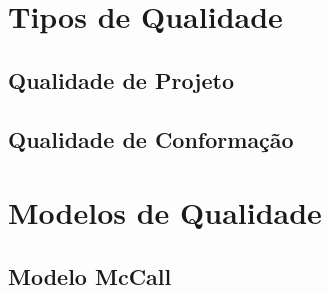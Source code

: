 \documentclass[
	12pt,				%
	openright,			%
	twoside,			%
	a4paper,			%
	english,			%
	brazil,				%
	]{abntex2}
\begin{document}
\section{Tipos de Qualidade}


\subsection{Qualidade de Projeto}


\subsection{Qualidade de Conformação}

\section{Modelos de Qualidade}

\subsection{Modelo McCall}

\end{document}
